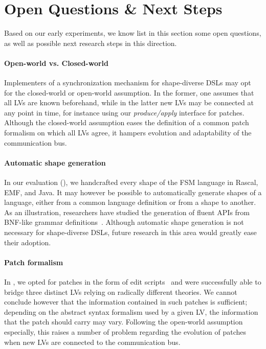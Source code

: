 \section{Open Questions \& Next Steps}
\label{sec:discussion}
Based on our early experiments, we know list in this section some open questions, as well as possible next research steps in this direction.

\paragraph{Open-world vs. Closed-world}
Implementers of a synchronization mechanism for shape-diverse DSLs may opt for the closed-world or open-world assumption.
In the former, one assumes that all LVs are known beforehand, while in the latter new LVs may be connected at any point in time, for instance using our \emph{produce/apply} interface for patches.
Although the closed-world assumption eases the definition of a common patch formalism on which all LVs agree, it hampers evolution and adaptability of the communication bus.

\paragraph{Automatic shape generation}
In our evaluation (), we handcrafted every shape of the FSM language in Rascal, EMF, and Java.
It may however be possible to automatically generate shapes of a language, either from a common language definition or from a shape to another.
As an illustration, researchers have studied the generation of fluent APIs from BNF-like grammar definitions~\cite{nakamaru2017silverchain}.
Although automatic shape generation is not necessary for shape-diverse DSLs, future research in this area would greatly ease their adoption.

\paragraph{Patch formalism}
In \prism, we opted for patches in the form of edit scripts~\cite{rozen2017towards} and were successfully able to bridge three distinct LVs relying on radically different theories.
We cannot conclude however that the information contained in such patches is sufficient; depending on the abstract syntax formalism used by a given LV, the information that the patch should carry may vary.
Following the open-world assumption especially, this raises a number of problem regarding the evolution of patches when new LVs are connected to the communication bus.

